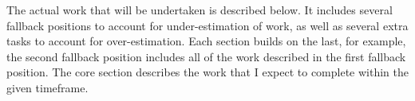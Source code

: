 The actual work that will be undertaken is described below. It includes several fallback positions to account for under-estimation of work, as well as several extra tasks to account for over-estimation. Each section builds on the last, for example, the second fallback position includes all of the work described in the first fallback position. The core section describes the work that I expect to complete within the given timeframe.
